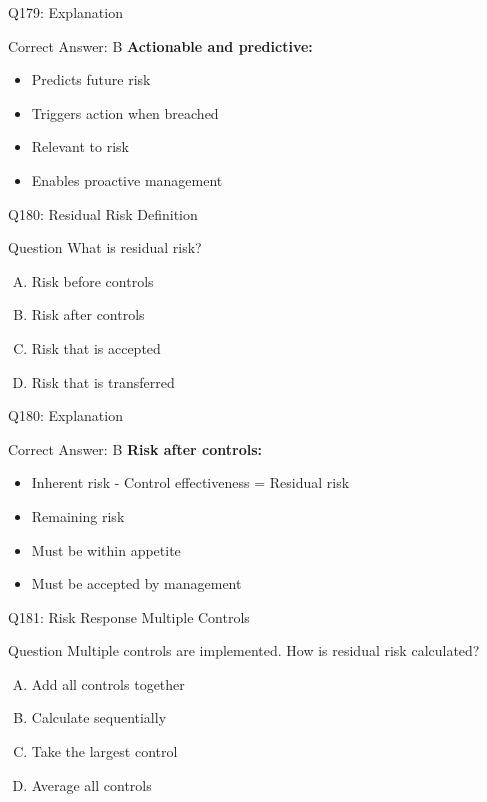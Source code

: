 \documentclass{beamer}
\begin{document}
	\begin{frame}{Q179: Explanation}
		\begin{block}{Correct Answer: B}
			\textbf{Actionable and predictive:}
			\begin{itemize}
				\item Predicts future risk
				\item Triggers action when breached
				\item Relevant to risk
				\item Enables proactive management
			\end{itemize}
		\end{block}
	\end{frame}
	
	\begin{frame}{Q180: Residual Risk Definition}
		\begin{block}{Question}
			What is residual risk?
		\end{block}
		\begin{enumerate}[(A)]
			\item Risk before controls
			\item Risk after controls
			\item Risk that is accepted
			\item Risk that is transferred
		\end{enumerate}
	\end{frame}
	
	\begin{frame}{Q180: Explanation}
		\begin{block}{Correct Answer: B}
			\textbf{Risk after controls:}
			\begin{itemize}
				\item Inherent risk - Control effectiveness = Residual risk
				\item Remaining risk
				\item Must be within appetite
				\item Must be accepted by management
			\end{itemize}
		\end{block}
	\end{frame}
	
	\begin{frame}{Q181: Risk Response Multiple Controls}
		\begin{block}{Question}
			Multiple controls are implemented. How is residual risk calculated?
		\end{block}
		\begin{enumerate}[(A)]
			\item Add all controls together
			\item Calculate sequentially
			\item Take the largest control
			\item Average all controls
		\end{enumerate}
	\end{frame}
	
\end{document}
